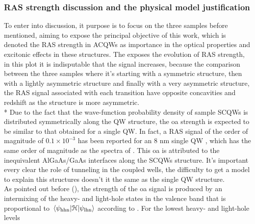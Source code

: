 \subsubsection{RAS strength discussion and the physical model justification}
\label{subsubsec:chapter-3-ras-discussed}
\vspace{-10mm}
To enter into discussion, it purpose is to focus on the three samples before mentioned, aiming to expose the principal objective of this work, which is denoted the \gls{RAS} strength in \gls{ACQWs} as importance in the  optical properties and excitonic effects in these structures. The  exposes the evolution of \gls{RAS} strength, in this plot it is indisputable that the signal increases, because the comparison between the three samples where it's starting with a symmetric structure, then with a lightly asymmetric structure and finally with a very asymmetric structure, the \gls{RAS} signal associated with each transition have opposite concavities and redshift as the structure is more asymmetric. \\*
Due to the fact that the wave-function probability density of sample \gls{SCQWs} is distributed symmetrically along the QW
structure, the \gls{oa} strength is expected to be similar to that
obtained for a single QW. In fact, a \gls{RAS} signal of the order of magnitude of $0.1\times 10^{-3}$ has been reported for an 8 nm single QW \cite{chen2002interface}, which has the same order of magnitude as the spectra of . This \gls{oa} is attributed to the inequivalent AlGaAs/GaAs interfaces along the \gls{SCQWs}
structure. It's important every clear the role of tunneling in the coupled wells, the difficulty to get a model to explain this structures  doesn't it the same as the single QW structure.  \\
As pointed out before (), the strength of the \gls{oa} signal is produced by an intermixing of the heavy- and light-hole states in the valence band that is proportional to  $\mel{\psi_{\mathrm{hhn}}}{\cal{H}}{\psi_{\mathrm{lhn}}}$ according to . For the lowest heavy- and light-hole levels

